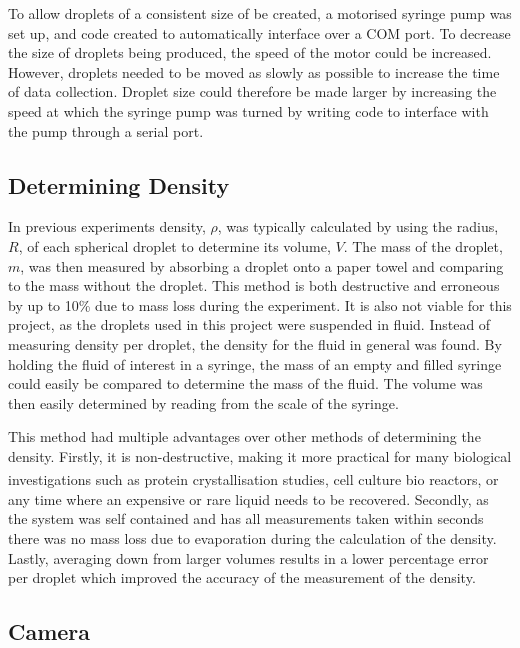 \documentclass{physics_article_B}
\begin{document}
        To allow droplets of a consistent size of be created, a motorised syringe pump was set up, and code created to automatically interface over a COM port. To decrease the size of droplets being produced, the speed of the motor could be increased. However, droplets needed to be moved as slowly as possible to increase the time of data collection. Droplet size could therefore be made larger by increasing the speed at which the syringe pump was turned by writing code to interface with the pump through a serial port.
        
        
    \subsection{Determining Density\label{sect:method:density}}
    
        In previous experiments density, $\rho$, was typically calculated by using the radius, $R$, of each spherical droplet to determine its volume, $V$. The mass of the droplet, $m$, was then measured by absorbing a droplet onto a paper towel and comparing to the mass without the droplet\cite{hill}. This method is both destructive and erroneous by up to 10\%\cite{harrold2} due to mass loss during the experiment. It is also not viable for this project, as the droplets used in this project were suspended in fluid. Instead of measuring density per droplet, the density for the fluid in general was found. By holding the fluid of interest in a syringe, the mass of an empty and filled syringe could easily be compared to determine the mass of the fluid. The volume was then easily determined by reading from the scale of the syringe.
    
        This method had multiple advantages over other methods of determining the density. Firstly, it is non-destructive, making it more practical for many biological investigations such as protein crystallisation studies\textsuperscript{\cite{zhu}}, cell culture bio reactors\textsuperscript{\cite{konry}}, or any time where an expensive or rare liquid needs to be recovered\cite{Backholm2017}. Secondly, as the system was self contained and has all measurements taken within seconds there was no mass loss due to evaporation during the calculation of the density. Lastly, averaging down from larger volumes results in a lower percentage error per droplet which improved the accuracy of the measurement of the density.
        
    \subsection{Camera\label{sect:method:vision}}
        
\end{document}
